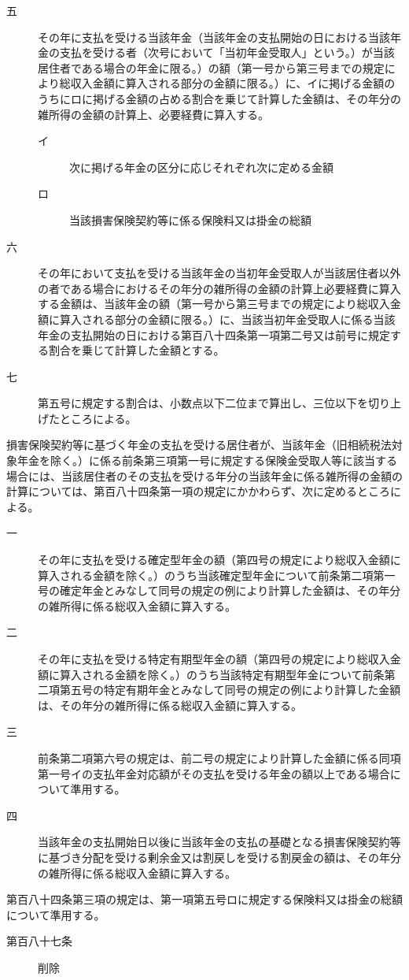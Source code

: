 \documentclass[twocolumn,a4j,10pt]{ltjtarticle}
\begin{document}
\begin{description}
\begin{description}
\item[五]その年に支払を受ける当該年金（当該年金の支払開始の日における当該年金の支払を受ける者（次号において「当初年金受取人」という。）が当該居住者である場合の年金に限る。）の額（第一号から第三号までの規定により総収入金額に算入される部分の金額に限る。）に、イに掲げる金額のうちにロに掲げる金額の占める割合を乗じて計算した金額は、その年分の雑所得の金額の計算上、必要経費に算入する。
\begin{description}
\item[イ]次に掲げる年金の区分に応じそれぞれ次に定める金額
\item[ロ]当該損害保険契約等に係る保険料又は掛金の総額
\end{description}
\item[六]その年において支払を受ける当該年金の当初年金受取人が当該居住者以外の者である場合におけるその年分の雑所得の金額の計算上必要経費に算入する金額は、当該年金の額（第一号から第三号までの規定により総収入金額に算入される部分の金額に限る。）に、当該当初年金受取人に係る当該年金の支払開始の日における第百八十四条第一項第二号又は前号に規定する割合を乗じて計算した金額とする。
\item[七]第五号に規定する割合は、小数点以下二位まで算出し、三位以下を切り上げたところによる。
\end{description}
\item[\rensuji{2}]損害保険契約等に基づく年金の支払を受ける居住者が、当該年金（旧相続税法対象年金を除く。）に係る前条第三項第一号に規定する保険金受取人等に該当する場合には、当該居住者のその支払を受ける年分の当該年金に係る雑所得の金額の計算については、第百八十四条第一項の規定にかかわらず、次に定めるところによる。
\begin{description}
\item[一]その年に支払を受ける確定型年金の額（第四号の規定により総収入金額に算入される金額を除く。）のうち当該確定型年金について前条第二項第一号の確定年金とみなして同号の規定の例により計算した金額は、その年分の雑所得に係る総収入金額に算入する。
\item[二]その年に支払を受ける特定有期型年金の額（第四号の規定により総収入金額に算入される金額を除く。）のうち当該特定有期型年金について前条第二項第五号の特定有期年金とみなして同号の規定の例により計算した金額は、その年分の雑所得に係る総収入金額に算入する。
\item[三]前条第二項第六号の規定は、前二号の規定により計算した金額に係る同項第一号イの支払年金対応額がその支払を受ける年金の額以上である場合について準用する。
\item[四]当該年金の支払開始日以後に当該年金の支払の基礎となる損害保険契約等に基づき分配を受ける剰余金又は割戻しを受ける割戻金の額は、その年分の雑所得に係る総収入金額に算入する。
\end{description}
\item[\rensuji{3}]第百八十四条第三項の規定は、第一項第五号ロに規定する保険料又は掛金の総額について準用する。
\end{description}
\begin{description}
\item[第百八十七条]削除
\end{description}
\end{document}

